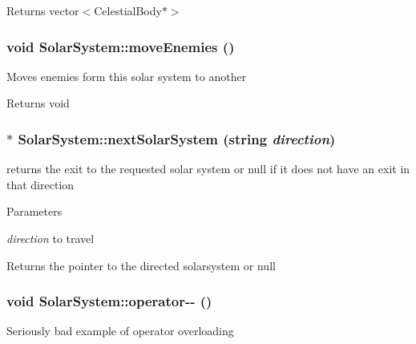 \begin{DoxyReturn}{Returns}
vector$<$CelestialBody$\ast$$>$ 
\end{DoxyReturn}
\hypertarget{classSolarSystem_a1efb6ebd3741f3fce2f5cb7d1eeffc19}{
\subsubsection[{moveEnemies}]{\setlength{\rightskip}{0pt plus 5cm}void SolarSystem::moveEnemies ()}}
\label{df/d5e/classSolarSystem_a1efb6ebd3741f3fce2f5cb7d1eeffc19}
Moves enemies form this solar system to another

\begin{DoxyReturn}{Returns}
void 
\end{DoxyReturn}
\hypertarget{classSolarSystem_a65d3cebc039c25bc4427f72fb20c890c}{
\subsubsection[{nextSolarSystem}]{ $\ast$ SolarSystem::nextSolarSystem (string {\em direction})}}
\label{df/d5e/classSolarSystem_a65d3cebc039c25bc4427f72fb20c890c}
returns the exit to the requested solar system or null if it does not have an exit in that direction


\begin{DoxyParams}{Parameters}
\item[{\em direction}]to travel\end{DoxyParams}
\begin{DoxyReturn}{Returns}
the pointer to the directed solarsystem or null 
\end{DoxyReturn}
\hypertarget{classSolarSystem_a41f1cdf83a580bd2258d9233ef0cdb4f}{
\subsubsection[{operator-\/-\/}]{\setlength{\rightskip}{0pt plus 5cm}void SolarSystem::operator-\/-\/ ()}}
\label{df/d5e/classSolarSystem_a41f1cdf83a580bd2258d9233ef0cdb4f}
Seriously bad example of operator overloading

